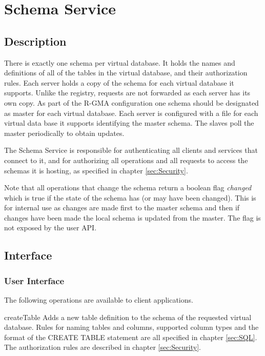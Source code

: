 \section{Schema Service}\label{sec:Schema}
\subsection{Description}

There is exactly one schema per virtual database. It holds the names and 
definitions of all of the tables in the virtual database, and their 
authorization rules. Each server holds a copy of the schema for each virtual 
database it supports. Unlike the registry, requests are not forwarded as each 
server has its own copy. As part of the R-GMA configuration one schema should 
be designated as master for each virtual database. Each server is configured 
with a file for each virtual data base it supports identifying the master 
schema. The slaves poll the master periodically to obtain updates.

The Schema Service is responsible for authenticating all clients and
services that connect to it, and for authorizing all operations and
all requests to access the schemas it is hosting, as specified in
chapter \ref{sec:Security}.

Note that all operations that change the schema return a boolean flag
\textit{changed} which is true if the state of the schema has (or may have been
changed). This is for internal use as changes are made first to the master
schema and then if changes have been made the local schema is updated from the
master. The flag is not exposed by the user API.

\subsection{Interface}

\subsubsection{User Interface}
The following operations are available to client applications.

\begin{method}{createTable}
\desc Adds a new table definition to the schema of the requested virtual database.
Rules for naming tables and columns, supported column types and the format of
the CREATE TABLE statement are all specified in chapter \ref{sec:SQL}. The
authorization rules are described in chapter \ref{sec:Security}. 
\end{method}

